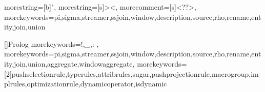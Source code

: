 
{
  morestring=[b]",
  morestring=[s]{>}{<},
  morecomment=[s]{<?}{?>},
  morekeywords={pi,sigma,streamer,ssjoin,window,description,source,rho,rename,entity,join,union}%
}

[]{Prolog}{
   morekeywords={!,\_,:-},
   morekeywords={pi,sigma,streamer,ssjoin,window,description,source,rho,rename,entity,join,union,aggregate,windowaggregate},%
   morekeywords=[2]{pushselectionrule,typerules,attribrules,sugar,pushprojectionrule,macrogroup,implrules,optimizationrule,dynamicoperator,isdynamic}
}
\def\sql#1{\lstinline[language=SQL,basicstyle=\normalsize\ttfamily\upshape]|#1|}